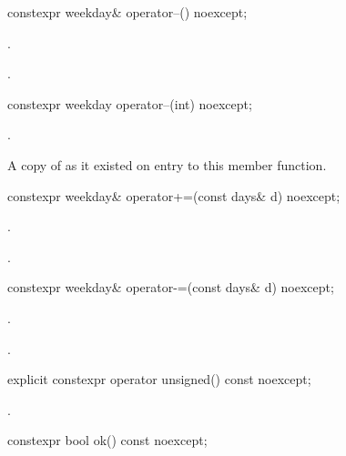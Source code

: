 %
\begin{itemdecl}
constexpr weekday& operator--() noexcept;
\end{itemdecl}

\begin{itemdescr}
\pnum
\effects {}.

\pnum
\returns {}.
\end{itemdescr}

%
\begin{itemdecl}
constexpr weekday operator--(int) noexcept;
\end{itemdecl}

\begin{itemdescr}
\pnum
\effects {}.

\pnum
\returns A copy of  as it existed on entry to this member function.
\end{itemdescr}

%
\begin{itemdecl}
constexpr weekday& operator+=(const days& d) noexcept;
\end{itemdecl}

\begin{itemdescr}
\pnum
\effects {}.

\pnum
\returns {}.
\end{itemdescr}

%
\begin{itemdecl}
constexpr weekday& operator-=(const days& d) noexcept;
\end{itemdecl}

\begin{itemdescr}
\pnum
\effects {}.

\pnum
\returns {}.
\end{itemdescr}

%
\begin{itemdecl}
explicit constexpr operator unsigned() const noexcept;
\end{itemdecl}

\begin{itemdescr}
\pnum
\returns {}.
\end{itemdescr}

%
\begin{itemdecl}
constexpr bool ok() const noexcept;
\end{itemdecl}

